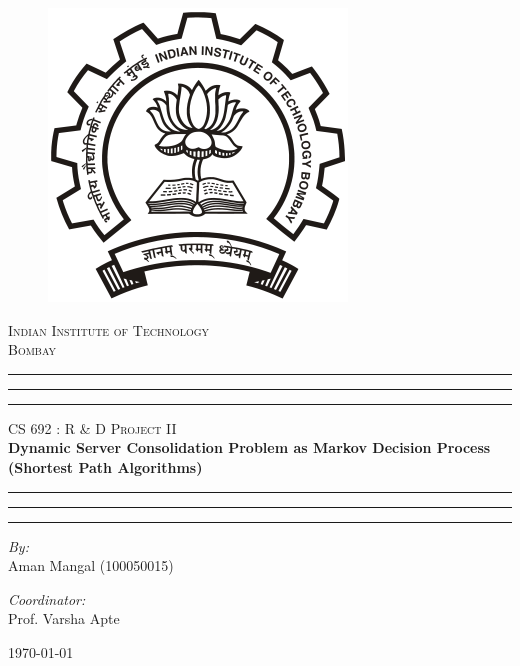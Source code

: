 \begin{titlepage}
\begin{figure}[ht!]
    \begin{center}
		\includegraphics[scale = .4]{images/iitb}
	\end{center}
\end{figure}
\vspace*{-1cm}
\begin{center}
	\textsc{\LARGE Indian Institute of Technology
			\\Bombay} \\[2.5cm]

    \vspace*{1.5cm}
	\hrule \hrule \hrule
	\vspace{0.5cm}	
	\textsc{\Large CS 692 : R \& D Project II}\\[0.5cm]
	{\large \bfseries Dynamic Server Consolidation Problem as Markov Decision Process (Shortest Path Algorithms)} \\[0.5cm]
	\hrule \hrule \hrule
	\vspace{4cm}
	
	\begin{minipage}{0.4\textwidth}
	\begin{flushleft} \large
		\emph{By:} \\
		Aman Mangal (100050015)
	\end{flushleft}
	\end{minipage}
	\begin{minipage}{0.45\textwidth}
	\begin{flushright} \large
		\emph{Coordinator:} \\
		Prof. Varsha Apte
	\end{flushright}
	\end{minipage}
	\vspace{0.5cm}
	
	{\large \today}
\end{center}
\end{titlepage}
